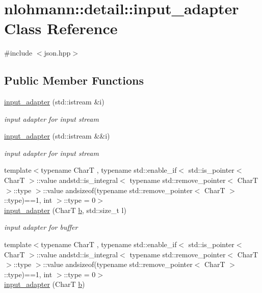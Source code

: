 \hypertarget{classnlohmann_1_1detail_1_1input__adapter}{}\section{nlohmann\+:\+:detail\+:\+:input\+\_\+adapter Class Reference}
\label{classnlohmann_1_1detail_1_1input__adapter}


{\ttfamily \#include $<$json.\+hpp$>$}

\subsection*{Public Member Functions}
\begin{DoxyCompactItemize}
\item 
\hyperlink{classnlohmann_1_1detail_1_1input__adapter_ae89f11268d4724b3080473f7218abe86}{input\+\_\+adapter} (std\+::istream \&i)
\begin{DoxyCompactList}\small\item\em input adapter for input stream \end{DoxyCompactList}\item 
\hyperlink{classnlohmann_1_1detail_1_1input__adapter_af002dd2e53ac0855a03cb68d0ce626b2}{input\+\_\+adapter} (std\+::istream \&\&i)
\begin{DoxyCompactList}\small\item\em input adapter for input stream \end{DoxyCompactList}\item 
{\footnotesize template$<$typename CharT , typename std\+::enable\+\_\+if$<$ std\+::is\+\_\+pointer$<$ Char\+T $>$\+::value andstd\+::is\+\_\+integral$<$ typename std\+::remove\+\_\+pointer$<$ Char\+T $>$\+::type $>$\+::value andsizeof(typename std\+::remove\+\_\+pointer$<$ Char\+T $>$\+::type)==1, int $>$\+::type  = 0$>$ }\\\hyperlink{classnlohmann_1_1detail_1_1input__adapter_a37816622d79ab4a1a76f4d7e872b65e1}{input\+\_\+adapter} (CharT \hyperlink{jquery_8js_a2fa551895933fae935a0a6b87282241d}{b}, std\+::size\+\_\+t l)
\begin{DoxyCompactList}\small\item\em input adapter for buffer \end{DoxyCompactList}\item 
{\footnotesize template$<$typename CharT , typename std\+::enable\+\_\+if$<$ std\+::is\+\_\+pointer$<$ Char\+T $>$\+::value andstd\+::is\+\_\+integral$<$ typename std\+::remove\+\_\+pointer$<$ Char\+T $>$\+::type $>$\+::value andsizeof(typename std\+::remove\+\_\+pointer$<$ Char\+T $>$\+::type)==1, int $>$\+::type  = 0$>$ }\\\hyperlink{classnlohmann_1_1detail_1_1input__adapter_a86f035d9c4319360014b922b5e433ced}{input\+\_\+adapter} (CharT \hyperlink{jquery_8js_a2fa551895933fae935a0a6b87282241d}{b})

\end{DoxyCompactItemize}
